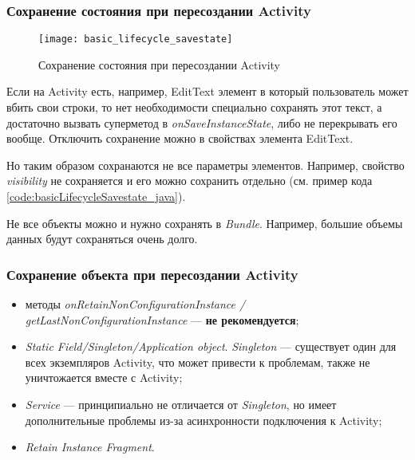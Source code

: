 	
\subsubsection{Сохранение состояния при пересоздании Activity}

	\begin{figure}[H]
	    \centering
	    \texttt{[image: basic\_lifecycle\_savestate]}
	    \caption{Сохранение состояния при пересоздании Activity}
	    \label{fig:basic_lifecycle_savestate}
	\end{figure}
	
	
	
Если на Activity есть, например, EditText элемент в который пользователь может вбить свои строки, то нет необходимости специально сохранять этот текст, а достаточно вызвать суперметод в \textit{onSaveInstanceState}, либо не перекрывать его вообще. Отключить сохранение можно в свойствах элемента EditText.

Но таким образом сохранаются не все параметры элементов. Например, свойство \textit{visibility} не сохраняется и его можно сохранить отдельно (см. пример кода \ref{code:basicLifecycleSavestate_java}).

Не все объекты можно и нужно сохранять в \textit{Bundle}. Например, большие объемы данных будут сохраняться очень долго. 


\subsubsection{Сохранение объекта при пересоздании Activity}

\begin{itemize}
	\item методы \textit{onRetainNonConfigurationInstance / \newline getLastNonConfigurationInstance} --- \textbf{не рекомендуется};
	\item \textit{Static Field/Singleton/Application object}. \newline \textit{Singleton} --- существует один для всех экземпляров Activity, что может привести к проблемам, также не уничтожается вместе с Activity;
	\item \textit{Service} --- принципиально не отличается от \textit{Singleton}, но имеет дополнительные проблемы из-за асинхронности подключения к Activity;
	\item \textit{Retain Instance Fragment}.
\end{itemize}